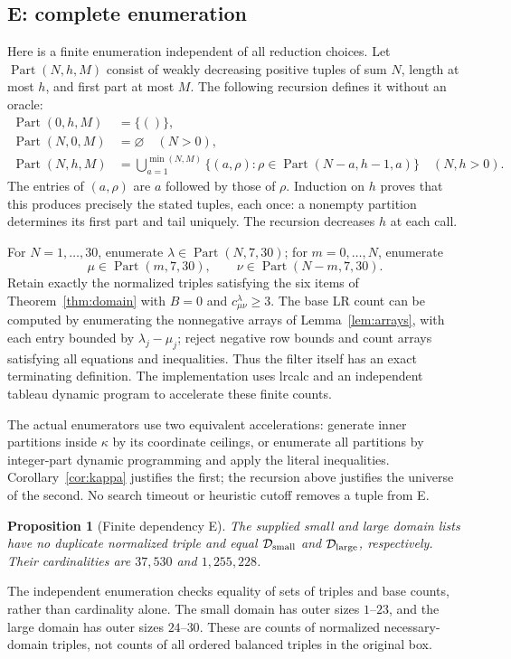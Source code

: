 \documentclass[11pt]{article}
\newtheorem{proposition}[theorem]{Proposition}
\begin{document}
\subsection{E: complete enumeration}
Here is a finite enumeration independent of all reduction choices.
Let $\operatorname{Part}(N,h,M)$ consist of weakly decreasing positive tuples
of sum $N$, length at most $h$, and first part at most $M$.
The following recursion defines it without an oracle:
\[
\begin{split}
\operatorname{Part}(0,h,M)&=\{()\},\\
\operatorname{Part}(N,0,M)&=\varnothing\quad(N>0),\\
\operatorname{Part}(N,h,M)&=
 \bigcup_{a=1}^{\min(N,M)}
 \{(a,\rho):\rho\in\operatorname{Part}(N-a,h-1,a)\}
 \quad(N,h>0).
\end{split}
\]
The entries of $(a,\rho)$ are $a$ followed by those of $\rho$.
Induction on $h$ proves that this produces precisely the stated tuples,
each once: a nonempty partition determines its first part and tail
uniquely. The recursion decreases $h$ at each call.

For $N=1,\ldots,30$, enumerate
$\lambda\in\operatorname{Part}(N,7,30)$; for $m=0,\ldots,N$,
enumerate
\[
 \mu\in\operatorname{Part}(m,7,30),\qquad
 \nu\in\operatorname{Part}(N-m,7,30).
\]
Retain exactly the normalized triples satisfying the six items of
Theorem~\ref{thm:domain} with $B=0$ and $c^\lambda_{\mu\nu}\ge3$.
The base LR count can be computed by enumerating the nonnegative arrays
of Lemma~\ref{lem:arrays}, with each entry bounded by $\lambda_j-\mu_j$;
reject negative row bounds and count arrays satisfying all equations
and inequalities. Thus the filter itself has an exact terminating
definition. The implementation uses lrcalc and an independent tableau
dynamic program to accelerate these finite counts.

The actual enumerators use two equivalent accelerations: generate inner
partitions inside $\kappa$ by its coordinate ceilings, or enumerate all
partitions by integer-part dynamic programming and apply the literal
inequalities. Corollary~\ref{cor:kappa} justifies the first; the recursion
above justifies the universe of the second. No search timeout or heuristic
cutoff removes a tuple from E.

\begin{proposition}[Finite dependency E]\label{comp:E}
The supplied small and large domain lists have no duplicate normalized
triple and equal $\mathcal D_{\rm small}$ and $\mathcal D_{\rm large}$,
respectively. Their cardinalities are $37,530$ and $1,255,228$.
\end{proposition}
The independent enumeration checks equality of sets of triples and base
counts, rather than cardinality alone. The small domain has outer sizes
$1$--$23$, and the large domain has outer sizes $24$--$30$.
These are counts of normalized necessary-domain triples, not counts of
all ordered balanced triples in the original box.
\end{document}
